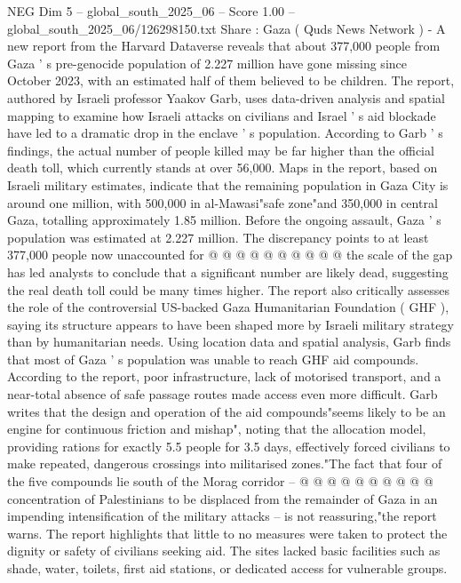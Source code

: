 \begin{textsample}{NEG Dim 5 – global\_south\_2025\_06 – Score 1.00 – global\_south\_2025\_06/126298150.txt}  \label{ex:f5_neg_418}
Share : Gaza ( Quds News Network ) - A new report from the Harvard Dataverse reveals that about 377,000 people from Gaza ' s pre-genocide population of 2.227 million have gone missing since October 2023, with an estimated half of them believed to be children.
The report, authored by Israeli professor Yaakov Garb, uses data-driven analysis and spatial mapping to examine how Israeli attacks on civilians and Israel ' s aid blockade have led to a dramatic drop in the enclave ' s population.
According to Garb ' s findings, the actual number of people killed may be far higher than the official death toll, which currently stands at over 56,000.
Maps in the report, based on Israeli military estimates, indicate that the remaining population in Gaza City is around one million, with 500,000 in al-Mawasi"safe zone"and 350,000 in central Gaza, totalling approximately 1.85 million.
Before the ongoing assault, Gaza ' s population was estimated at 2.227 million.
The discrepancy points to at least 377,000 people now unaccounted for @ @ @ @ @ @ @ @ @ @ the scale of the gap has led analysts to conclude that a significant number are likely dead, suggesting the real death toll could be many times higher.
The report also critically assesses the role of the controversial US-backed Gaza Humanitarian Foundation ( GHF ), saying its structure appears to have been shaped more by Israeli military strategy than by humanitarian needs.
Using location data and spatial analysis, Garb finds that most of Gaza ' s population was unable to reach GHF aid compounds.
According to the report, poor infrastructure, lack of motorised transport, and a near-total absence of safe passage routes made access even more difficult.
Garb writes that the design and operation of the aid compounds"seems likely to be an engine for continuous friction and mishap", noting that the allocation model, providing rations for exactly 5.5 people for 3.5 days, effectively forced civilians to make repeated, dangerous crossings into militarised zones."The fact that four of the five compounds lie south of the Morag corridor -- @ @ @ @ @ @ @ @ @ @ concentration of Palestinians to be displaced from the remainder of Gaza in an impending intensification of the military attacks -- is not reassuring,"the report warns.
The report highlights that little to no measures were taken to protect the dignity or safety of civilians seeking aid.
The sites lacked basic facilities such as shade, water, toilets, first aid stations, or dedicated access for vulnerable groups.

\end{textsample}
